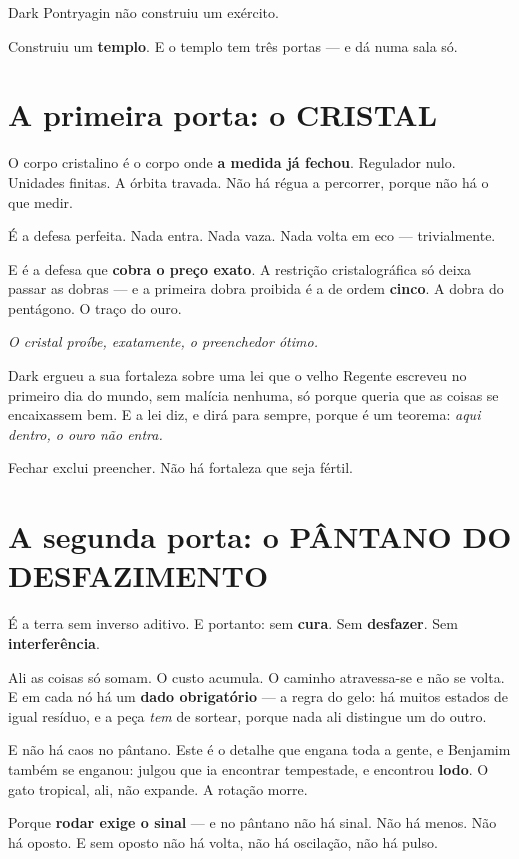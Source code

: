\documentclass[livro.tex]{subfiles}
\begin{document}
Dark Pontryagin não construiu um exército.

Construiu um \textbf{templo}. E o templo tem três portas --- e dá numa sala só.

\section*{A primeira porta: o CRISTAL}

O corpo cristalino é o corpo onde \textbf{a medida já fechou}. Regulador nulo. Unidades finitas. A órbita travada.
Não há régua a percorrer, porque não há o que medir.

É a defesa perfeita. Nada entra. Nada vaza. Nada volta em eco --- trivialmente.

E é a defesa que \textbf{cobra o preço exato}. A restrição cristalográfica só deixa passar as dobras
--- e a primeira dobra proibida é a de ordem \textbf{cinco}. A dobra do pentágono. O traço do ouro.

\emph{O cristal proíbe, exatamente, o preenchedor ótimo.}

Dark ergueu a sua fortaleza sobre uma lei que o velho Regente escreveu no primeiro dia do mundo, sem malícia
nenhuma, só porque queria que as coisas se encaixassem bem. E a lei diz, e dirá para sempre, porque é um teorema:
\emph{aqui dentro, o ouro não entra.}

Fechar exclui preencher. Não há fortaleza que seja fértil.

\section*{A segunda porta: o PÂNTANO DO DESFAZIMENTO}

É a terra sem inverso aditivo. E portanto: sem \textbf{cura}. Sem \textbf{desfazer}. Sem \textbf{interferência}.

Ali as coisas só somam. O custo acumula. O caminho atravessa-se e não se volta. E em cada nó há um \textbf{dado
obrigatório} --- a regra do gelo: há muitos estados de igual resíduo, e a peça \emph{tem} de sortear, porque nada
ali distingue um do outro.

E não há caos no pântano. Este é o detalhe que engana toda a gente, e Benjamim também se enganou: julgou que ia
encontrar tempestade, e encontrou \textbf{lodo}. O gato tropical, ali, não expande. A rotação morre.

Porque \textbf{rodar exige o sinal} --- e no pântano não há sinal. Não há menos. Não há oposto. E sem oposto não há
volta, não há oscilação, não há pulso.
\end{document}
